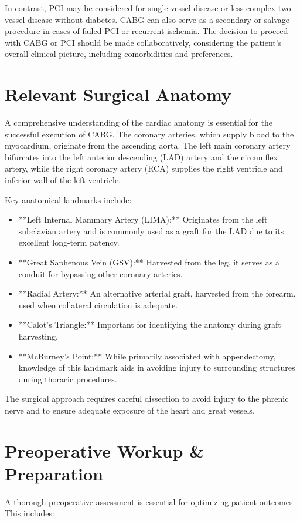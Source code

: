 In contrast, PCI may be considered for single-vessel disease or less complex two-vessel disease without diabetes. CABG can also serve as a secondary or salvage procedure in cases of failed PCI or recurrent ischemia. The decision to proceed with CABG or PCI should be made collaboratively, considering the patient's overall clinical picture, including comorbidities and preferences.

\section*{Relevant Surgical Anatomy}
A comprehensive understanding of the cardiac anatomy is essential for the successful execution of CABG. The coronary arteries, which supply blood to the myocardium, originate from the ascending aorta. The left main coronary artery bifurcates into the left anterior descending (LAD) artery and the circumflex artery, while the right coronary artery (RCA) supplies the right ventricle and inferior wall of the left ventricle. 

Key anatomical landmarks include:

\begin{itemize}
  \item **Left Internal Mammary Artery (LIMA):** Originates from the left subclavian artery and is commonly used as a graft for the LAD due to its excellent long-term patency.
  \item **Great Saphenous Vein (GSV):** Harvested from the leg, it serves as a conduit for bypassing other coronary arteries.
  \item **Radial Artery:** An alternative arterial graft, harvested from the forearm, used when collateral circulation is adequate.
  \item **Calot's Triangle:** Important for identifying the anatomy during graft harvesting.
  \item **McBurney's Point:** While primarily associated with appendectomy, knowledge of this landmark aids in avoiding injury to surrounding structures during thoracic procedures.
\end{itemize}

The surgical approach requires careful dissection to avoid injury to the phrenic nerve and to ensure adequate exposure of the heart and great vessels.

\section*{Preoperative Workup \& Preparation}
A thorough preoperative assessment is essential for optimizing patient outcomes. This includes:

